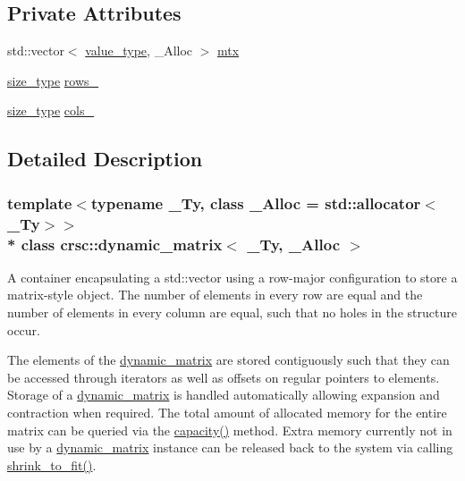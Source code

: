 \subsection*{Private Attributes}
\begin{DoxyCompactItemize}
\item 
std\+::vector$<$ \hyperlink{classcrsc_1_1dynamic__matrix_a27b83d28002e3e2bb316f1f0460e9cca}{value\+\_\+type}, \+\_\+\+Alloc $>$ \hyperlink{classcrsc_1_1dynamic__matrix_a01ba435d0d468b1ff8de25baba9b658c}{mtx}
\item 
\hyperlink{classcrsc_1_1dynamic__matrix_a52b776dc7f60d8798c884d7d3c361a8a}{size\+\_\+type} \hyperlink{classcrsc_1_1dynamic__matrix_afa3fb44b323d54a0d4c02b2fc00e7357}{rows\+\_\+}
\item 
\hyperlink{classcrsc_1_1dynamic__matrix_a52b776dc7f60d8798c884d7d3c361a8a}{size\+\_\+type} \hyperlink{classcrsc_1_1dynamic__matrix_a350bb926a6e6d0bafcfb05cbf7c7b410}{cols\+\_\+}
\end{DoxyCompactItemize}


\subsection{Detailed Description}
\subsubsection*{template$<$typename \+\_\+\+Ty, class \+\_\+\+Alloc = std\+::allocator$<$\+\_\+\+Ty$>$$>$\\*
class crsc\+::dynamic\+\_\+matrix$<$ \+\_\+\+Ty, \+\_\+\+Alloc $>$}

A container encapsulating a {\ttfamily std\+::vector} using a row-\/major configuration to store a matrix-\/style object. The number of elements in every row are equal and the number of elements in every column are equal, such that no holes in the structure occur. 

The elements of the {\ttfamily \hyperlink{classcrsc_1_1dynamic__matrix}{dynamic\+\_\+matrix}} are stored contiguously such that they can be accessed through iterators as well as offsets on regular pointers to elements. Storage of a {\ttfamily \hyperlink{classcrsc_1_1dynamic__matrix}{dynamic\+\_\+matrix}} is handled automatically allowing expansion and contraction when required. The total amount of allocated memory for the entire matrix can be queried via the {\ttfamily \hyperlink{classcrsc_1_1dynamic__matrix_a066eb3ce3657da138b4401d66bbee5d7}{capacity()}} method. Extra memory currently not in use by a {\ttfamily \hyperlink{classcrsc_1_1dynamic__matrix}{dynamic\+\_\+matrix}} instance can be released back to the system via calling {\ttfamily \hyperlink{classcrsc_1_1dynamic__matrix_a0a59ebdab34a354b2f933a78c1d1efda}{shrink\+\_\+to\+\_\+fit()}}.

